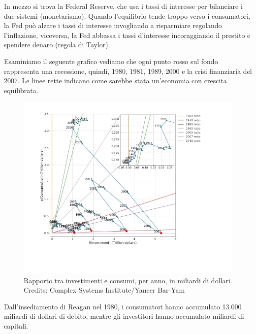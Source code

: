 \documentclass[12pt]{book} %
\begin{document}
In mezzo si trova la Federal Reserve, che usa i tassi di interesse per bilanciare i due sistemi
(monetarismo). Quando l'equilibrio tende
troppo verso i consumatori, la Fed può alzare i tassi di interesse invogliando a risparmiare regolando l'inflazione,
viceversa, la Fed abbassa i tassi d'interesse incoraggiando il prestito e spendere denaro (regola di
Taylor).

Esaminiamo il seguente grafico vediamo che ogni punto rosso sul fondo rappresenta una recessione, quindi, 1980, 1981,
1989, 2000 e la crisi finanziaria del 2007. Le linee rette indicano come sarebbe stata un'economia con crescita
equilibrata. 

\begin{figure}[H]
  \begin{minipage}{17cm}
    \includegraphics[width=17cm]{images/Libro-img041.png}
    \caption{Rapporto tra investimenti e consumi, per anno, in miliardi di dollari. Credits: Complex Systems Institute/Yaneer Bar-Yam}
  \end{minipage}
\end{figure} 

Dall'insediamento di Reagan nel 1980, i consumatori hanno accumulato 13.000 miliardi di dollari di debito, mentre gli
investitori hanno accumulato miliardi di
capitali.
\end{document}
